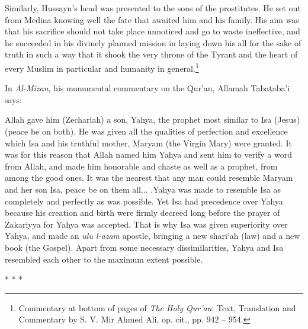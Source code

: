Similarly, Hussayn's head was presented to the sons of the prostitutes. He set out from Medina knowing well the fate that awaited him and his family. His aim was that his sacrifice should not take place unnoticed and go to waste ineffective, and he succeeded in his divinely planned mission in laying down his all for the sake of truth in such a way that it shook the very throne of the Tyrant and the heart of every Muslim in particular and humanity in general.\footnote{Commentary at bottom of pages of \emph{The Holy Qur'an}: Text, Translation and Commentary by S. V. Mir Ahmed Ali, op. cit., pp. 942 -- 954.}

In \emph{Al-Mizan}, his monumental commentary on the Qur'an, Allamah Tabataba'i says:

\begin{quotex}
Allah gave him (Zechariah) a son, Yahya, the prophet most similar to Isa (Jesus) (peace be on both). He was given all the qualities of perfection and excellence which Isa and his truthful mother, Maryam (the Virgin Mary) were granted. It was for this reason that Allah named him Yahya and sent him to verify a word from Allah, and made him honorable and chaste as well as a prophet, from among the good ones. It was the nearest that any man could resemble Maryam and her son Isa, peace be on them all... .Yahya was made to resemble Isa as completely and perfectly as was possible. Yet Isa had precedence over Yahya because his creation and birth were firmly decreed long before the prayer of Zakariyya for Yahya was accepted. That is why Isa was given superiority over Yahya, and made an \emph{ulu l-azam} apostle, bringing a new shari`ah (law) and a new book (the Gospel). Apart from some necessary dissimilarities, Yahya and Isa resembled each other to the maximum extent possible.
\end{quotex}


\begin{center}* * *\end{center}

